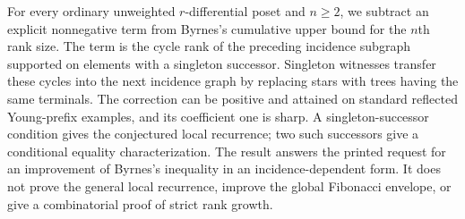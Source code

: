 
For every ordinary unweighted $r$-differential poset and $n\ge2$, we subtract
an explicit nonnegative term from Byrnes's cumulative upper bound for the
$n$th rank size. The term is the cycle rank of the preceding incidence
subgraph supported on elements with a singleton successor. Singleton
witnesses transfer these cycles into the next incidence graph by replacing
stars with trees having the same terminals. The correction can be positive
and attained on standard reflected Young-prefix examples, and its coefficient
one is sharp. A singleton-successor condition gives the conjectured local
recurrence; two such successors give a conditional equality characterization.
The result answers the printed request for an improvement of Byrnes's
inequality in an incidence-dependent form. It does not prove the general
local recurrence, improve the global Fibonacci envelope, or give a
combinatorial proof of strict rank growth.
